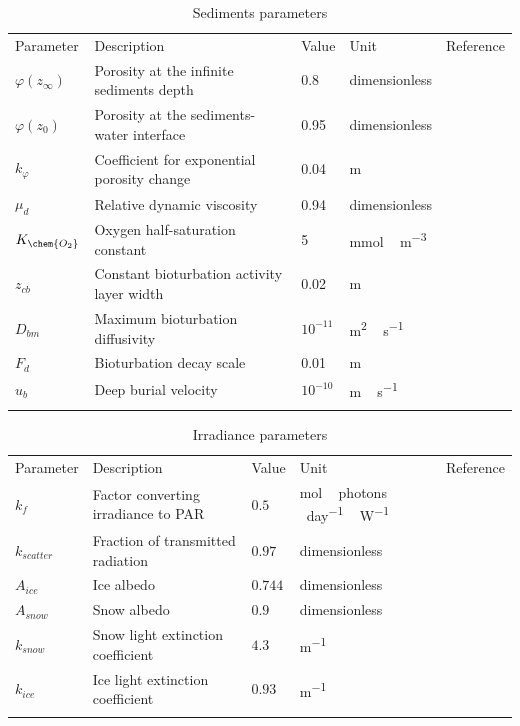 \documentclass[gmd, manuscript]{copernicus}
\begin{document}
\begin{table}[H]
\centering
\caption{Sediments parameters}
\label{table:Sediments_parameters}
\begin{tabular}{lllll}
\tophline
    Parameter & Description & Value & Unit & Reference \\
\middlehline
    $\varphi(z_{\infty})$ & Porosity at the infinite sediments depth & 0.8 & dimensionless & \citep{Soetaert1996} \\
    $\varphi(z_{0})$ & Porosity at the sediments-water interface & 0.95 & dimensionless & \citep{Soetaert1996} \\
    $k_{\varphi}$ & Coefficient for exponential porosity change & 0.04 & \unit{m} & \citep{Soetaert1996} \\
    $\mu_{d}$ & Relative dynamic viscosity & 0.94 & dimensionless & \citep{Boudreau1997} \\
    $K_{\chem{O_{2}}}$ & Oxygen half-saturation constant & 5 & \unit{mmol\,m^{-3}} & \citep{Yakushev2017} \\
    $z_{cb}$ & Constant bioturbation activity layer width & 0.02 & \unit{m} & \citep{Boudreau1997} \\
    $D_{bm}$ & Maximum bioturbation diffusivity & $10^{-11}$ & \unit{m^{2}\,s^{-1}} & \citep{Boudreau1997} \\
    $F_{d}$ & Bioturbation decay scale & 0.01 & \unit{m} & \citep{Boudreau1997} \\
    $u_{b}$ & Deep burial velocity & $10^{-10}$ & \unit{m\,s^{-1}} & \citep{Boudreau1997} \\
\bottomhline
\end{tabular}
\belowtable{} %
\end{table}

\begin{table}[H]
\centering
\caption{Irradiance parameters}
\label{table:Irradiance_parameters}
\begin{tabular}{lllll}
\tophline
    Parameter & Description & Value & Unit & Reference \\
\middlehline
    $k_{f}$ & Factor converting irradiance to \textrm{PAR} & $0.5$ & \unit{mol\,photons\,day^{-1}\,W^{-1}} & \citep{Mobley2012} \\
    $k_{scatter}$ & Fraction of transmitted radiation & $0.97$ & dimensionless & \citep{Light2008} \\
    $A_{ice}$ & Ice albedo & $0.744$ & dimensionless & \citep{Light2008} \\
    $A_{snow}$ & Snow albedo & $0.9$ & dimensionless & \citep{Perovich2007} \\
    $k_{snow}$ & Snow light extinction coefficient & $4.3$ & \unit{m^{-1}} & \citep{Perovich2007} \\
    $k_{ice}$ & Ice light extinction coefficient & $0.93$ & \unit{m^{-1}} & \citep{Light2008} \\
\bottomhline
\end{tabular}
\belowtable{} %
\end{table}
\end{document}
